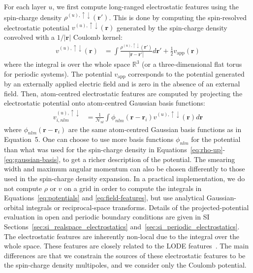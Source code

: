 \documentclass[aps,%
superscriptaddress,
 amsmath,amssymb,
floatfix,
twocolumn
]{revtex4-2}
\newcommand{\R}{\mathbb{R}}
\begin{document}
For each layer $u$, we first compute long-ranged electrostatic features using the spin-charge density $\rho^{(u), \uparrow \downarrow}(\mathbf{r'})$.  This is done by computing the spin-resolved electrostatic potential $v^{(u),\uparrow\downarrow}(\mathbf{r})$ generated by the spin-charge density convolved with a $1/|\mathbf{r}|$ Coulomb kernel:
\begin{align}
v^{(u),\uparrow\downarrow}(\mathbf{r}) &= \int \frac{\rho^{(u), \uparrow \downarrow}(\mathbf{r'})}{|\mathbf{r} - \mathbf{r'}|} d\mathbf{r'} + \frac{1}{2}v_{\text{app}}(\mathbf{r})
\label{eq:potentials}
\end{align}
where the integral is over the whole space $\R^3$ (or a three-dimensional flat torus for periodic systems). The potential $v_{\text{app}}$ corresponds to the potential generated by an externally applied electric field and is zero in the absence of an external field.
Then, atom-centred electrostatic features are computed by projecting the electrostatic potential onto atom-centred Gaussian basis functions:
\begin{align}
v_{i,nlm}^{(u), \uparrow \downarrow} &= \frac{1}{\mathcal{N}_{nl}}\int \phi_{nlm}(\mathbf{r} - \mathbf{r}_i) v^{(u), \uparrow \downarrow}(\mathbf{r})d\mathbf{r} 
\label{eq:field-features}
\end{align}
where  $\phi_{nlm}(\mathbf{r} - \mathbf{r}_i)$ are the same atom-centred Gaussian
basis functions as in Equation~5.
One can choose to use more basis functions $\phi_{nlm}$ for the potential than what was used for the spin-charge density in Equations~\eqref{eq:rho-up}-\eqref{eq:gaussian-basis}, to get a richer description of the potential. The smearing width and maximum angular momentum can also be chosen differently to those used in the spin-charge density expansion. In a practical implementation, we do not compute $\rho$ or $v$ on a grid in order to compute the integrals in Equations~\ref{eq:potentials} and \ref{eq:field-features}, but use analytical Gaussian-orbital integrals or reciprocal-space transforms. Details of the projected-potential evaluation in open and periodic boundary conditions are given in SI Sections~\ref{sec:si_realspace_electrostatics} and~\ref{sec:si_periodic_electrostatics}. 
The electrostatic features are inherently non-local due to the integral over the whole space. These features are closely related to the LODE features~\cite{Grisafi2019}. The main differences are that we constrain the sources of these electrostatic features to be the spin-charge density multipoles, and we consider only the Coulomb potential.
\end{document}
